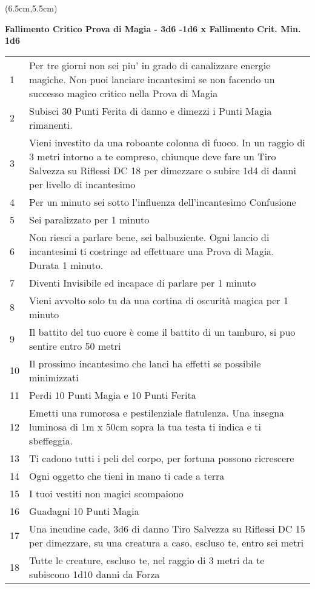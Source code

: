 \documentclass[a4paper,12 pt,openany]{book}
\begin{document}
\begin{textblock*}{13.5cm}(6.5cm,5.5cm) %
{\footnotesize
\textbf{Fallimento Critico Prova di Magia - 3d6 -1d6 x Fallimento Crit. Min. 1d6}
\begin{tabularx}{0.95\textwidth}{lX}
1 & Per tre giorni non sei piu' in grado di canalizzare energie magiche. Non puoi lanciare incantesimi se non facendo un successo magico critico nella Prova di Magia\\
2 & Subisci 30 Punti Ferita di danno e dimezzi i Punti Magia rimanenti.\\
3 & Vieni investito da una roboante colonna di fuoco. In un raggio di 3 metri intorno a te compreso, chiunque deve fare un Tiro Salvezza su Riflessi DC 18 per dimezzare o subire 1d4 di danni per livello di incantesimo\\
4 & Per un minuto sei sotto l'influenza dell'incantesimo Confusione\\
5 & Sei paralizzato per 1 minuto\\
6 & Non riesci a parlare bene, sei balbuziente. Ogni lancio di incantesimi ti costringe ad effettuare una Prova di Magia. Durata 1 minuto.\\
7 & Diventi Invisibile ed incapace di parlare per 1 minuto\\
8 & Vieni avvolto solo tu da una cortina di oscurità magica per 1 minuto\\
9 & Il battito del tuo cuore è come il battito di un tamburo, si puo sentire entro 50 metri\\
10 & Il prossimo incantesimo che lanci ha effetti se possibile minimizzati\\
11 & Perdi 10 Punti Magia e 10 Punti Ferita\\
12 & Emetti una rumorosa e pestilenziale flatulenza. Una insegna luminosa di 1m x 50cm sopra la tua testa ti indica e ti sbeffeggia.\\
13 & Ti cadono tutti i peli del corpo, per fortuna possono ricrescere\\
14 & Ogni oggetto che tieni in mano ti cade a terra\\
15 & I tuoi vestiti non magici scompaiono\\
16 & Guadagni 10 Punti Magia\\
17 & Una incudine cade, 3d6 di danno Tiro Salvezza su Riflessi DC 15 per dimezzare, su una creatura a caso, escluso te, entro sei metri\\
18 & Tutte le creature, escluso te, nel raggio di 3 metri da te subiscono 1d10 danni da Forza\\
\end{tabularx}}
\end{textblock*}
\end{document}
